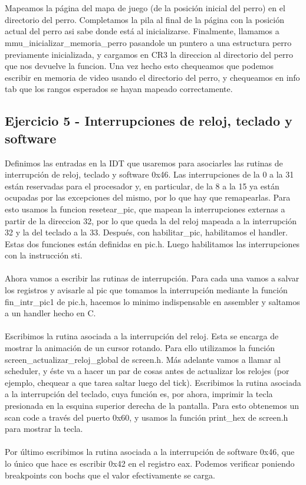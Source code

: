 \documentclass[10pt,a4paper,spanish]{article}
\begin{document}
\\ \\
Mapeamos la página del mapa de juego (de la posición inicial del perro)  en el directorio del perro.
Completamos la pila al final de la página con la posición actual del perro asi sabe donde está al inicializarse.
Finalmente, llamamos a mmu\_inicializar\_memoria\_perro pasandole un puntero a una estructura perro previamente inicializada, y cargamos en CR3 la direccion al directorio del perro que nos devuelve la funcion. Una vez hecho esto chequeamos que podemos escribir en memoria de video usando el directorio del perro, y chequeamos en info tab que los rangos esperados se hayan mapeado correctamente.

\subsection{Ejercicio 5 - Interrupciones de reloj, teclado y software}
Definimos las entradas en la IDT que usaremos para asociarles las rutinas de interrupción de reloj, teclado y software 0x46.
Las interrupciones de la 0 a la 31 están reservadas para el procesador y, en particular, de la 8 a la 15 ya están ocupadas por las excepciones del mismo, por lo que hay que remapearlas. Para esto usamos la funcion resetear\_pic, que mapean la interrupciones externas a partir de la direccion 32, por lo que queda la del reloj mapeada a la interrupción 32 y  la del teclado a la 33. Después, con habilitar\_pic, habilitamos el handler. Estas dos funciones están definidas en pic.h.
Luego habilitamos las interrupciones con la instrucción sti.
\\ \\
Ahora vamos a escribir las rutinas de interrupción. Para cada una vamos a salvar los registros y avisarle al pic que tomamos la interrupción mediante la función fin\_intr\_pic1 de pic.h, hacemos lo minimo indispensable en assembler y saltamos a un handler hecho en C.
\\ \\
Escribimos la rutina asociada a la interrupción del reloj. Esta se encarga de mostrar la animación de un cursor rotando. Para ello utilizamos la función screen\_actualizar\_reloj\_global de screen.h. Más adelante vamos a llamar al scheduler, y éste va a hacer un par de cosas antes de actualizar los relojes (por ejemplo, chequear a que tarea saltar luego del tick).
Escribimos la rutina asociada a la interrupción del teclado, cuya función es, por ahora, imprimir la tecla presionada en la esquina superior derecha de la pantalla. Para esto obtenemos un scan code a través del puerto 0x60, y usamos la función print\_hex de screen.h para mostrar la tecla.
\\ \\
Por último escribimos la rutina asociada a la interrupción de software 0x46, que lo único que hace es escribir 0x42 en el registro eax. Podemos verificar poniendo breakpoints con bochs que el valor efectivamente se carga.
\end{document}
